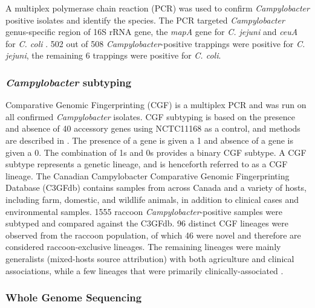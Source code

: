 \documentclass[letterpaper,titlepage,12pt]{article}
\begin{document}
A multiplex polymerase chain reaction (PCR) was used to confirm \textit{Campylobacter} positive isolates and identify the species. The PCR targeted \textit{Campylobacter} genus-specific region of 16S rRNA gene, the \textit{mapA} gene for \textit{C. jejuni} and \textit{ceuA} for \textit{C. coli}  \parencite{denis1999development}. 502 out of 508 \textit{Campylobacter}-positive trappings were positive for \textit{C. jejuni}, the remaining 6 trappings were positive for \textit{C. coli}.



\subsubsection{\textit{Campylobacter} subtyping} %


Comparative Genomic Fingerprinting (CGF) is a multiplex PCR and was run on all confirmed \textit{Campylobacter} isolates. CGF subtyping is based on the presence and absence of 40 accessory genes using NCTC11168 as a control, and methods are described in \cite{Taboada788}. The presence of a gene is given a 1 and absence of a gene is given a 0. The combination of 1s and 0s provides a binary CGF subtype. A CGF subtype represents a genetic lineage, and is henceforth referred to as a CGF lineage. The Canadian Campylobacter Comparative Genomic Fingerprinting Database (C3GFdb) contains samples from across Canada and a variety of hosts, including farm, domestic, and wildlife animals, in addition to clinical cases and environmental samples. 1555 raccoon \textit{Campylobacter}-positive samples were subtyped and compared against the C3GFdb. 96 distinct CGF lineages were observed from the raccoon population, of which 46 were novel and therefore are considered raccoon-exclusive lineages. The remaining lineages were mainly generalists (mixed-hosts source attribution) with both agriculture and clinical associations, while a few lineages that were primarily clinically-associated \parencite{mutschall2020campylobacter}. 

\subsubsection{Whole Genome Sequencing}
\end{document}
